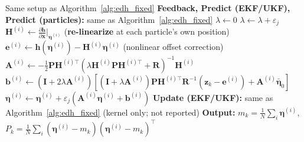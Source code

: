 \documentclass{article}
\begin{document}
\begin{algorithm}[H]
\caption{LEDH Flow Filter (Local Per-Particle Linearization)}
\label{alg:ledh}
\begin{algorithmic}[1]
\REQUIRE Same setup as Algorithm~\ref{alg:edh_fixed}
  \STATE \textbf{Feedback, Predict (EKF/UKF), Predict (particles):} same as Algorithm~\ref{alg:edh_fixed}
  \STATE $\lambda \leftarrow 0$
    \STATE $\lambda \leftarrow \lambda + \varepsilon_j$
      \STATE $\mathbf{H}^{(i)} \leftarrow \frac{\partial \mathbf{h}}{\partial \mathbf{x}}\Big|_{\boldsymbol{\eta}^{(i)}}$ \hfill (\textbf{re-linearize} at each particle's own position)
      \STATE $\mathbf{e}^{(i)} \leftarrow \mathbf{h}(\boldsymbol{\eta}^{(i)}) - \mathbf{H}^{(i)}\boldsymbol{\eta}^{(i)}$ \hfill (nonlinear offset correction)
      \STATE $\mathbf{A}^{(i)} \leftarrow -\tfrac{1}{2}\mathbf{P}\mathbf{H}^{(i)\top}(\lambda\mathbf{H}^{(i)}\mathbf{P}\mathbf{H}^{(i)\top} + \mathbf{R})^{-1}\mathbf{H}^{(i)}$
      \STATE $\mathbf{b}^{(i)} \leftarrow (\mathbf{I}+2\lambda\mathbf{A}^{(i)})[(\mathbf{I}+\lambda\mathbf{A}^{(i)})\mathbf{P}\mathbf{H}^{(i)\top}\mathbf{R}^{-1}(\mathbf{z}_k - \mathbf{e}^{(i)}) + \mathbf{A}^{(i)}\bar{\boldsymbol{\eta}}_0]$
      \STATE $\boldsymbol{\eta}^{(i)} \leftarrow \boldsymbol{\eta}^{(i)} + \varepsilon_j(\mathbf{A}^{(i)}\boldsymbol{\eta}^{(i)} + \mathbf{b}^{(i)})$
    \ENDFOR
  \ENDFOR
  \STATE \textbf{Update (EKF/UKF):} same as Algorithm~\ref{alg:edh_fixed} \hfill (kernel only; not reported)
  \STATE \textbf{Output:} $m_k = \frac{1}{N}\sum_i \boldsymbol{\eta}^{(i)}$, \; $P_k = \frac{1}{N}\sum_i(\boldsymbol{\eta}^{(i)}-m_k)(\boldsymbol{\eta}^{(i)}-m_k)^\top$
\ENDFOR
\end{algorithmic}
\end{algorithm}

\end{document}
